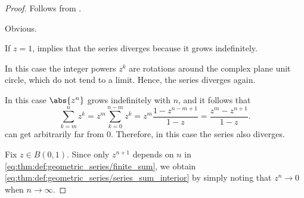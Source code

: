 \begin{proof}
   Follows from .

   Obvious.


   If \( z = 1 \),  implies that the series diverges because it grows indefinitely.

   In this case the integer powers \( z^k \) are rotations around the complex plane unit circle, which do not tend to a limit. Hence, the series diverges again.

   In this case \( \abs{z^n} \) grows indefinitely with \( n \), and it follows that
  \begin{equation*}
    \sum_{k=m}^n z^k
    =
    z^m \sum_{k=0}^{n-m} z^k
    =
    z^m \frac {1 - z^{n-m+1}} {1 - z}
    =
    \frac {z^m - z^{n+1}} {1 - z}.
  \end{equation*}
  can get arbitrarily far from \( 0 \). Therefore, in this case the series also diverges.

   Fix \( z \in B(0, 1) \). Since only \( z^{n + 1} \) depends on \( n \) in \eqref{eq:thm:def:geometric_series/finite_sum}, we obtain \eqref{eq:thm:def:geometric_series/series_sum_interior} by simply noting that \( z^n \to 0 \) when \( n \to \infty \).
\end{proof}

